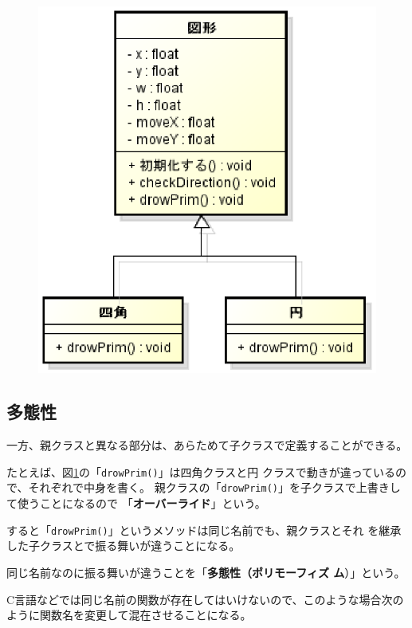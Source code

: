 \documentclass[uplatex,a4j,11pt]{jsarticle}
\begin{document}
\begin{figure}[htbp]
 \begin{center}
   \includegraphics[width=.4\paperwidth]{zu11.eps}
   \caption{}
  \label{214654_21Jul14}
 \end{center}
\end{figure}


\subsection{多態性}

一方、親クラスと異なる部分は、あらためて子クラスで定義することができる。

たとえば、図\ref{214654_21Jul14}の「\verb|drowPrim()|」は四角クラスと円
クラスで動きが違っているので、それぞれで中身を書く。
親クラスの「\verb|drowPrim()|」を子クラスで上書きして使うことになるので
「{\bfseries オーバーライド}」という。

すると「\verb|drowPrim()|」というメソッドは同じ名前でも、親クラスとそれ
を継承した子クラスとで振る舞いが違うことになる。

同じ名前なのに振る舞いが違うことを「{\bfseries 多態性（ポリモーフィズ
ム}）」という。

C言語などでは同じ名前の関数が存在してはいけないので、このような場合次の
ように関数名を変更して混在させることになる。
\end{document}
